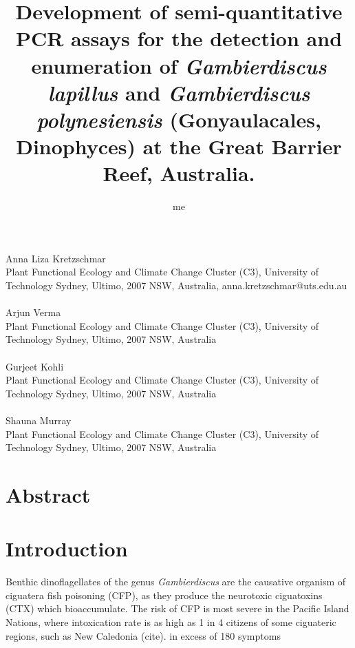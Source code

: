 \documentclass[12pt]{article}
\title{Development of semi-quantitative PCR assays for the detection and enumeration of \emph{Gambierdiscus lapillus} and \emph{Gambierdiscus polynesiensis} (Gonyaulacales, Dinophyces) at the Great Barrier Reef, Australia.}
\author{me}
\date{}
\begin{document}
\maketitle
\paragraph{}Anna Liza Kretzschmar\\
Plant Functional Ecology and Climate Change Cluster (C3), University of Technology Sydney, Ultimo, 2007 NSW, Australia, anna.kretzschmar@uts.edu.au
\paragraph{}Arjun Verma \\
Plant Functional Ecology and Climate Change Cluster (C3), University of Technology Sydney, Ultimo, 2007 NSW, Australia
\paragraph{}Gurjeet Kohli\\ 
Plant Functional Ecology and Climate Change Cluster (C3), University of Technology Sydney, Ultimo, 2007 NSW, Australia
\paragraph{}Shauna Murray\\ 
Plant Functional Ecology and Climate Change Cluster (C3), University of Technology Sydney, Ultimo, 2007 NSW, Australia
\newpage
\section{Abstract}

\newpage
\section{Introduction}
Benthic dinoflagellates of the genus \emph{Gambierdiscus} are the causative organism of ciguatera fish poisoning (CFP), as they produce the neurotoxic ciguatoxins (CTX) which bioaccumulate. The risk of CFP is most severe in the Pacific Island Nations, where intoxication rate is as high as 1 in 4 citizens of some ciguateric regions, such as New Caledonia (cite). in excess of 180 symptoms 
\end{document}
